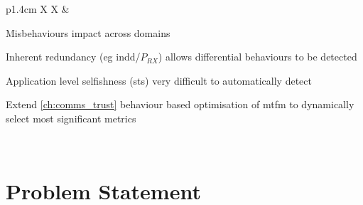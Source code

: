 \begin{table}
{\begin{tabularx}{\textwidth}{p{1.4cm} X X}
			& \begin{minipage}[t]{\linewidth}
				\begin{tightimize} 
					\item Misbehaviours impact across domains %
					\item Inherent redundancy (eg \gls{indd}/$P_{RX}$) allows differential behaviours to be detected %
					\item Application level selfishness (\gls{sts}) very difficult to automatically detect
					\item Extend \autoref{ch:comms_trust} behaviour based optimisation of \gls{mtfm} to dynamically select most significant metrics
				\end{tightimize}
			\end{minipage}\\
			\bottomrule
		\end{tabularx}
	}
\end{table}


\section{Problem Statement}



